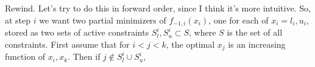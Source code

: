 \documentclass[11pt]{article}
\begin{document}
Rewind.  Let's try to do this in forward order, since I think it's more intuitive.  So, at step $i$ we want two partial minimizers of $f_{-1,i}(x_i)$, one for each of $x_i = l_i, u_i$, stored as two sets of active
constraints $S_l^i, S_u^i \subset S$, where $S$ is the set of all constraints.  First assume that for $i < j < k$, the optimal $x_j$ is an increasing function of $x_i, x_k$.  Then if $j \notin S_l^i \cup S_u^i$, 


\begin{comment}
Min and argmin of convex functions.  Let f(x,y) be a strictly convex function bounded from below.  Define
$$g(x) = min_y f(x,y)$$
$$h(x) = argmin_y f(x,y)$$
We have $f(x,h(x)) = g(x)$.  Consider x0, x1 = (x0+x2)/2, x2.  We have

  g(x1) <= f(x1,(h(x0)+h(x2))/2) <= 1/2 (f(x0,h(x0)) + f(x2,h(x2))) <= 1/2 (g(x0)+g(x2))

so g is convex.  What about h?  Assume that y is 1D (y in R).  Conjecture: h is monotonic.  Assume otherwise: that h(x1) < h(x0) < h(x2) say.  Specifically, assume

  h(x0) = a h(x1) + (1-a) h(x2),  0 < a < 1

Then

  g(x1,h(x1))

  g(x1,h(x1)) <= 1/2 (g(x0,h(x1)) + g(x2,h(x1)))

  g(x1,h(x0)) <= 1/2 (g(x0,h(x0)) + g(x2,h(x0))) <= 1/2 (a g(x0,h(x1)) + (1-a) g(x0,h(x2)) + a g(x2,h(x0)) + (1-a) 

  g(x0,h(x0)) <= a g(x0,h(x1)) + (1-a) g(x0,h(x2))

  g(x1,h(x1)) <= a

Assume both g and h are smooth.  We have

  gy(x,h(x)) = 0
  d/dx gy(x,h(x)) = 0
  gxy(x,h(x)) + gyy(x,h(x)) hx(x) = 0
  hx = -gxy/gyy

Convexity says

$$
  gxx >= 0
  gyy >= 0
  gxx gyy - gxy^2 >= 0

  g(x,y) = x^2 + y^2 + e sin (x+y)
$$

For small e, g(x,y) is convex, but we have
$$
  gx = 2x + e cos (x+y)
  gxy = -e sin (x+y)
  gyy = 2y - e sin (x+y)
  hx = -gxy/gyy = -e sin (x+y) / (2y - e sin (x+y)) = 1 / (1 - 2/e y/sin(x+y))

  gy = 2y + e cos (x+y)
  -2/e y/cos(x+y) = 0
  
$$



\end{comment}
\end{document}
